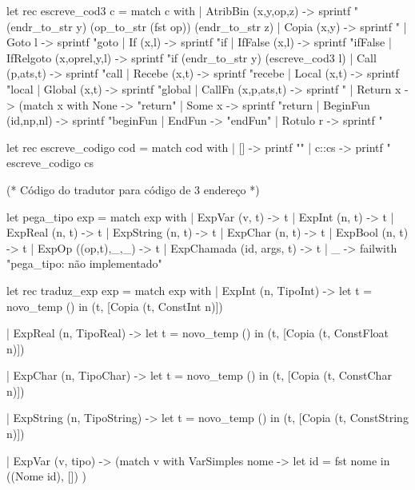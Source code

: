 \documentclass[12pt,a4paper,twoside]{article}
\begin{document}
\begin{terminal}
let rec escreve_cod3 c =
  match c with
  | AtribBin (x,y,op,z) -> 
      sprintf "%
                                (endr_to_str y) (op_to_str (fst op)) (endr_to_str z)
  | Copia (x,y) ->
      sprintf "%
  | Goto l ->
      sprintf "goto %
  | If (x,l) -> 
      sprintf "if %
  | IfFalse (x,l) -> 
      sprintf "ifFalse %
  | IfRelgoto (x,oprel,y,l) -> 
      sprintf "if %
                                     (endr_to_str y) (escreve_cod3 l)
  | Call (p,ats,t) -> sprintf "call %
  | Recebe (x,t) -> sprintf "recebe %
  | Local (x,t)  -> sprintf "local %
  | Global (x,t) -> sprintf "global %
  | CallFn (x,p,ats,t) -> 
      sprintf "%
  | Return x -> 
    (match x with
       None   -> "return\n"
     | Some x -> sprintf "return %
  | BeginFun (id,np,nl) -> sprintf "beginFun %
  | EndFun -> "endFun\n\n"
  | Rotulo r -> sprintf "%


let rec escreve_codigo cod =
  match cod with
  | [] -> printf "\n"
  | c::cs -> printf "%
             escreve_codigo cs 

(* Código do tradutor para código de 3 endereço *)

let pega_tipo exp = 
  match exp with
  | ExpVar (v, t) -> t
  | ExpInt (n, t) -> t
  | ExpReal (n, t) -> t
  | ExpString (n, t) -> t
  | ExpChar (n, t) -> t
  | ExpBool (n, t) -> t
  | ExpOp ((op,t),_,_) -> t
  | ExpChamada (id, args, t) -> t
  | _ -> failwith "pega_tipo: não implementado"


let rec traduz_exp exp =
  match exp with
  | ExpInt (n, TipoInt) -> 
     let t = novo_temp () in
    (t, [Copia (t, ConstInt n)])

  | ExpReal (n, TipoReal) -> 
     let t = novo_temp () in
    (t, [Copia (t, ConstFloat n)])
    
  | ExpChar (n, TipoChar) -> 
     let t = novo_temp () in
    (t, [Copia (t, ConstChar n)])
    
  | ExpString (n, TipoString) -> 
     let t = novo_temp () in
    (t, [Copia (t, ConstString n)])

  | ExpVar (v, tipo) ->
    (match v with
       VarSimples nome ->
       let id = fst nome in
       ((Nome id), [])
    )


\end{terminal}
\end{document}
